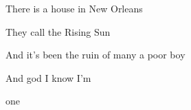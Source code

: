 \begin{song}
\bigskip

There is a house in New Orleans  \par
They call the Rising Sun  \par
And it’s been the ruin of many a poor boy \par
And god I know I’m \par
{}one    \par
{}    \par
{} \par
{}    \par
{}    \par
{} \par

\end{song}
